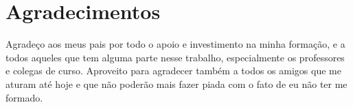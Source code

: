 \chapter*{Agradecimentos}

Agradeço aos meus pais por todo o apoio e investimento na minha formação, e a todos aqueles que tem alguma parte nesse trabalho, especialmente os professores e colegas de curso. Aproveito para agradecer também a todos os amigos que me aturam até hoje e que não poderão mais fazer piada com o fato de eu não ter me formado.
